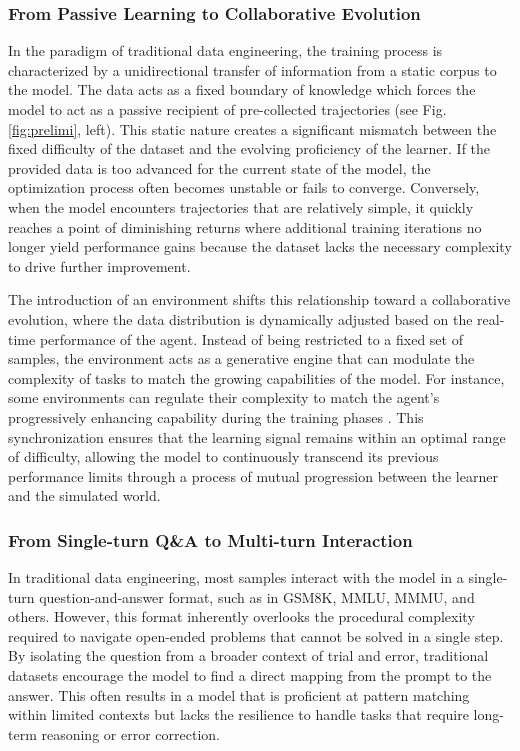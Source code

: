 \subsubsection{From Passive Learning to Collaborative Evolution}
In the paradigm of traditional data engineering, the training process is characterized by a unidirectional transfer of information from a static corpus to the model. The data acts as a fixed boundary of knowledge which forces the model to act as a passive recipient of pre-collected trajectories (see Fig. \ref{fig:prelimi}, left). This static nature creates a significant mismatch between the fixed difficulty of the dataset and the evolving proficiency of the learner. If the provided data is too advanced for the current state of the model, the optimization process often becomes unstable or fails to converge. Conversely, when the model encounters trajectories that are relatively simple, it quickly reaches a point of diminishing returns where additional training iterations no longer yield performance gains because the dataset lacks the necessary complexity to drive further improvement.

The introduction of an environment shifts this relationship toward a collaborative evolution, where the data distribution is dynamically adjusted based on the real-time performance of the agent. Instead of being restricted to a fixed set of samples, the environment acts as a generative engine that can modulate the complexity of tasks to match the growing capabilities of the model. For instance, some environments can regulate their complexity to match the agent’s progressively enhancing capability during the training phases \cite{AgentGen, DreamGym, SCALER}. This synchronization ensures that the learning signal remains within an optimal range of difficulty, allowing the model to continuously transcend its previous performance limits through a process of mutual progression between the learner and the simulated world.

\subsubsection{From Single-turn Q\&A to Multi-turn Interaction}
In traditional data engineering, most samples interact with the model in a single-turn question-and-answer format, such as in GSM8K\cite{GSM8k}, MMLU\cite{mmlu}, MMMU\cite{mmmu}, and others\cite{RAG-RewardBench}. However, this format inherently overlooks the procedural complexity required to navigate open-ended problems that cannot be solved in a single step. By isolating the question from a broader context of trial and error, traditional datasets encourage the model to find a direct mapping from the prompt to the answer. This often results in a model that is proficient at pattern matching within limited contexts but lacks the resilience to handle tasks that require long-term reasoning or error correction.

